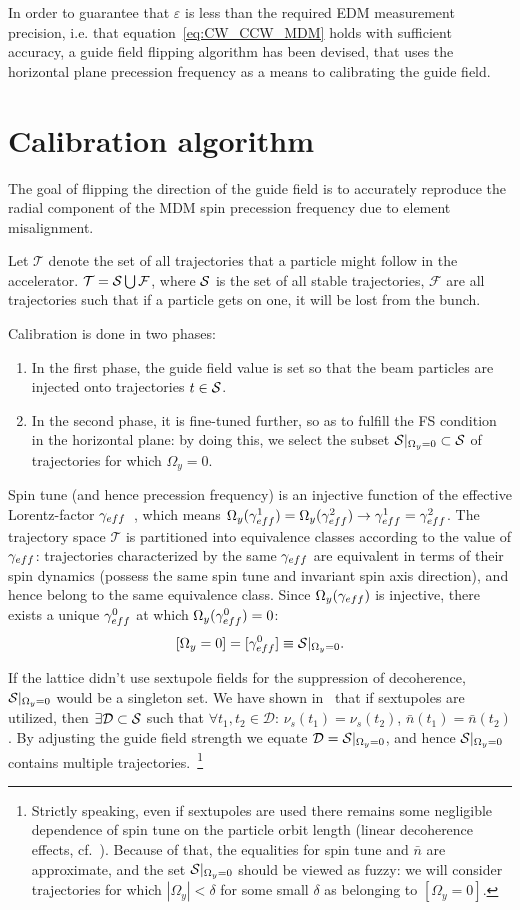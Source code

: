 \documentclass[a4paper]{jacow}
\newcommand{\W}{\Omega}
\newcommand{\Traj}{\mathcal T}
\newcommand{\Fail}{\mathcal F}
\newcommand{\D}{\mathcal D}
\newcommand{\nbar}{\bar n}
\begin{document}
In order to guarantee that $\varepsilon$ is less than the required EDM measurement precision, i.e. that
equation~\eqref{eq:CW_CCW_MDM} holds with sufficient accuracy,
a guide field flipping algorithm has been devised, that uses the horizontal plane precession frequency
as a means to calibrating the guide field. 

\section{Calibration algorithm}
The goal of flipping the direction of the guide field is to accurately reproduce the radial component
of the MDM spin precession frequency due to element misalignment.

Let $\Traj$ denote the set of all trajectories that a particle might follow in the accelerator.
$\Traj = \Stab \bigcup \Fail$, where $\Stab$ is the set of all stable trajectories, $\Fail$ are all trajectories
such that if a particle gets on one, it will be lost from the bunch.

Calibration is done in two phases:
\begin{enumerate}
\item In the first phase, the guide field value is set so that the beam particles are injected onto trajectories
  $t\in\Stab$.
\item In the second phase, it is fine-tuned further, so as to fulfill the FS condition in the horizontal plane:
  by doing this, we select the subset $\Stab*\subset\Stab$ of trajectories for which $\W_y = 0$.
\end{enumerate}

Spin tune (and hence precession frequency) is an injective function of the
effective Lorentz-factor $\g*$~\cite{Aksentev:DecohIPAC19}, which means
$\W_y(\g*^1) = \W_y(\g*^2) \rightarrow \g*^1 = \g*^2$. The trajectory space $\Traj$ is partitioned into equivalence
classes according to the value of $\g*$: trajectories characterized by the same $\g*$ are equivalent
in terms of their spin dynamics (possess the same spin tune and invariant spin axis direction),
and hence belong to the same equivalence class.
Since $\W_y(\g*)$ is injective, there exists a unique $\g*^0$ at which $\W_y(\g*^0)=0$:
\[
[\W_y=0] = [\g*^0] \equiv \Stab*.
\]

If the lattice didn't use sextupole fields for the suppression of decoherence,
$\Stab*$ would be a singleton set. We have shown in~\cite{Aksentev:DecohIPAC19} that if sextupoles are
utilized, then $\exists\D\subset\Stab$ such that $\forall t_1,t_2\in\D$:
$\nu_s(t_1) = \nu_s(t_2)$, $\nbar(t_1) = \nbar(t_2)$. By adjusting the guide field strength we equate
$\D=\Stab*$, and hence $\Stab*$ contains multiple trajectories.~\footnote{Strictly speaking,
  even if sextupoles are used there remains some negligible dependence of spin tune
  on the particle orbit length (linear decoherence effects, cf.~\cite{Aksentev:DecohIPAC19}).
  Because of that, the equalities for spin tune and $\nbar$ are approximate, and the set $\Stab*$
  should be viewed as fuzzy:
  we will consider trajectories for which $|\W_y|<\delta$ for some small $\delta$ as belonging to $[\W_y=0]$.}
\end{document}
